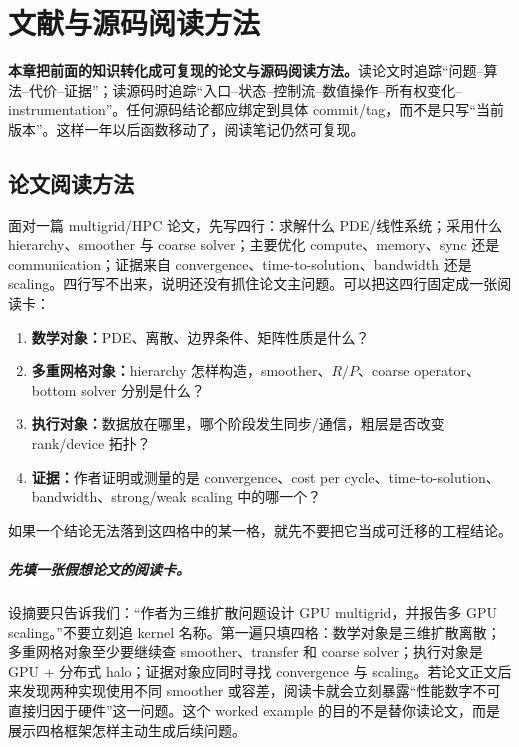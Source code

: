 \chapter{文献与源码阅读方法}
\label{ch:reading}

\begin{keybox}
\textbf{本章把前面的知识转化成可复现的论文与源码阅读方法。}读论文时追踪“问题--算法--代价--证据”；读源码时追踪“入口--状态--控制流--数值操作--所有权变化--instrumentation”。任何源码结论都应绑定到具体 commit/tag，而不是只写“当前版本”。这样一年以后函数移动了，阅读笔记仍然可复现。
\end{keybox}

\section{论文阅读方法}
面对一篇 multigrid/HPC 论文，先写四行：求解什么 PDE/线性系统；采用什么 hierarchy、smoother 与 coarse solver；主要优化 compute、memory、sync 还是 communication；证据来自 convergence、time-to-solution、bandwidth 还是 scaling。四行写不出来，说明还没有抓住论文主问题。可以把这四行固定成一张阅读卡：
\begin{enumerate}
\item \textbf{数学对象：}PDE、离散、边界条件、矩阵性质是什么？
\item \textbf{多重网格对象：}hierarchy 怎样构造，smoother、$R/P$、coarse operator、bottom solver 分别是什么？
\item \textbf{执行对象：}数据放在哪里，哪个阶段发生同步/通信，粗层是否改变 rank/device 拓扑？
\item \textbf{证据：}作者证明或测量的是 convergence、cost per cycle、time-to-solution、bandwidth、strong/weak scaling 中的哪一个？
\end{enumerate}
如果一个结论无法落到这四格中的某一格，就先不要把它当成可迁移的工程结论。


\paragraph{先填一张假想论文的阅读卡。}
设摘要只告诉我们：“作者为三维扩散问题设计 GPU multigrid，并报告多 GPU scaling。”不要立刻追 kernel 名称。第一遍只填四格：数学对象是三维扩散离散；多重网格对象至少要继续查 smoother、transfer 和 coarse solver；执行对象是 GPU + 分布式 halo；证据对象应同时寻找 convergence 与 scaling。若论文正文后来发现两种实现使用不同 smoother 或容差，阅读卡就会立刻暴露“性能数字不可直接归因于硬件”这一问题。这个 worked example 的目的不是替你读论文，而是展示四格框架怎样主动生成后续问题。

